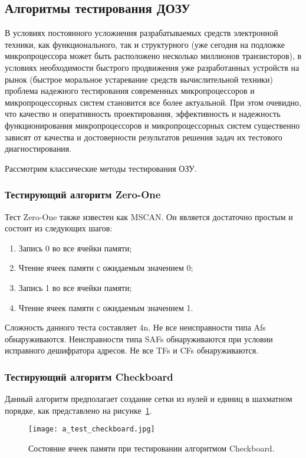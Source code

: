\subsection{Алгоритмы тестирования ДОЗУ}
\label{sub:domain:tests}
В условиях постоянного усложнения разрабатываемых средств электронной техники, как функционального, так и структурного (уже сегодня на подложке микропроцессора может быть расположено несколько миллионов транзисторов), в условиях необходимости быстрого продвижения уже разработанных устройств на рынок (быстрое моральное устаревание средств вычислительной техники) проблема надежного тестирования современных микропроцессоров и микропроцессорных систем становится все более актуальной. При этом очевидно, что качество и оперативность проектирования, эффективность и надежность функционирования микропроцессоров и микропроцессорных систем существенно зависят от качества и достоверности результатов решения задач их тестового диагностирования.

Рассмотрим классические методы тестирования ОЗУ.

\subsubsection{Тестирующий алгоритм Zero-One}
\label{sub:domain:tests:zero-one}
Тест Zero-One также известен как MSCAN. Он является достаточно простым и состоит из следующих шагов:
\begin{enumerate}
\item Запись 0 во все ячейки памяти;
\item Чтение ячеек памяти с ожидаемым значением 0;
\item Запись 1 во все ячейки памяти;
\item Чтение ячеек памяти с ожидаемым значением 1.
\end{enumerate}
Сложность данного теста составляет 4n. Не все неисправности типа Afs обнаруживаются. Неисправности типа SAFs обнаруживаются при условии исправного дешифратора адресов. Не все TFs и CFs обнаруживаются.

\subsubsection{Тестирующий алгоритм Checkboard}
\label{sub:domain:tests:checkboard}
Данный алгоритм предполагает создание сетки из нулей и единиц в шахматном порядке, как представлено на рисунке~\ref{fig:domain:tests:checkboard}. 

\begin{figure}[ht]
\centering
  \texttt{[image: a\_test\_checkboard.jpg]}  
  \caption{ Состояние ячеек памяти при тестировании алгоритмом Checkboard. }
  \label{fig:domain:tests:checkboard}
\end{figure}

